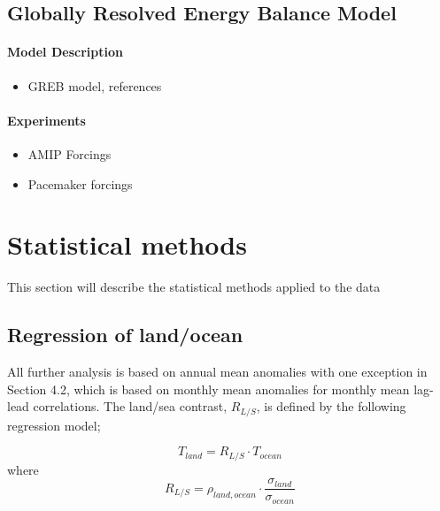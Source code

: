 \subsection{Globally Resolved Energy Balance Model}

\paragraph{Model Description}
\begin{itemize}
	\item GREB model, references
\end{itemize}


\paragraph{Experiments}
\begin{itemize}
	\item AMIP Forcings
	\item Pacemaker forcings
\end{itemize}


\section{Statistical methods}

This section will describe the statistical methods applied to the data


\subsection{Regression of land/ocean}\label{ssec:rlo}


All further analysis is based on annual mean anomalies with one exception in 
Section 4.2, which is based on monthly mean anomalies for monthly mean lag-lead
correlations. The land/sea contrast, $R_{L/S}$, is defined by the following 
regression model;

\begin{equation}
T_{land} = R_{L/S} \cdot T_{ocean}
\end{equation}
where
\begin{equation}
	R_{L/S} = \rho_{land,ocean}\cdot \frac{\sigma_{land}}{\sigma_{ocean}}
\end{equation}

